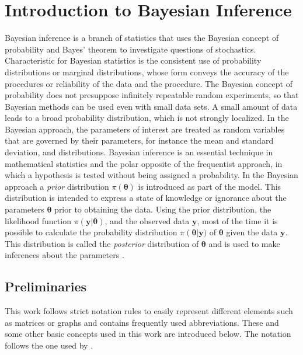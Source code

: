 %
\chapter{Introduction to Bayesian Inference}
\label{sec:bayes}
Bayesian inference is a branch of statistics that uses the Bayesian concept of probability and Bayes' theorem to investigate questions of stochastics.  Characteristic for Bayesian statistics is the consistent use of probability distributions or marginal distributions, whose form conveys the accuracy of the procedures or reliability of the data and the procedure. The Bayesian concept of probability does not presuppose infinitely repeatable random experiments, so that Bayesian methods can be used even with small data sets. A small amount of data leads to a broad probability distribution, which is not strongly localized. In the Bayesian approach, the parameters of interest are treated as random variables that are governed by their parameters, for instance the mean and standard deviation, and distributions. Bayesian inference is an essential technique in mathematical statistics and the polar opposite of the frequentist approach, in which a hypothesis is tested without being assigned a probability. In the Bayesian approach a \textit{prior} distribution $\pi\left(\pmb{\theta}\right)$ is introduced as part of the model. This distribution is intended to express a state of knowledge or ignorance about the parameters $\pmb{\theta}$ prior to obtaining the data. Using the prior distribution, the likelihood function $\pi\left(\pmb{y}|\pmb{\theta}\right)$, and the observed data $\pmb{y}$, most of the time it is possible to calculate the probability distribution $\pi\left(\pmb{\theta}\right|\pmb{y})$ of $\pmb{\theta}$ given the data $\pmb{y}$. This distribution is called the \textit{posterior} distribution of $\pmb{\theta}$ and is used to make inferences about the parameters \autocite[][6]{box2011bayesian}.
\clearpage
\section{Preliminaries}
This work follows strict notation rules to easily represent different elements such as matrices or graphs and contains frequently used abbreviations. These and some other basic concepts used in this work are introduced below. The notation follows the one used by \cite{rue2005gaussian}.

